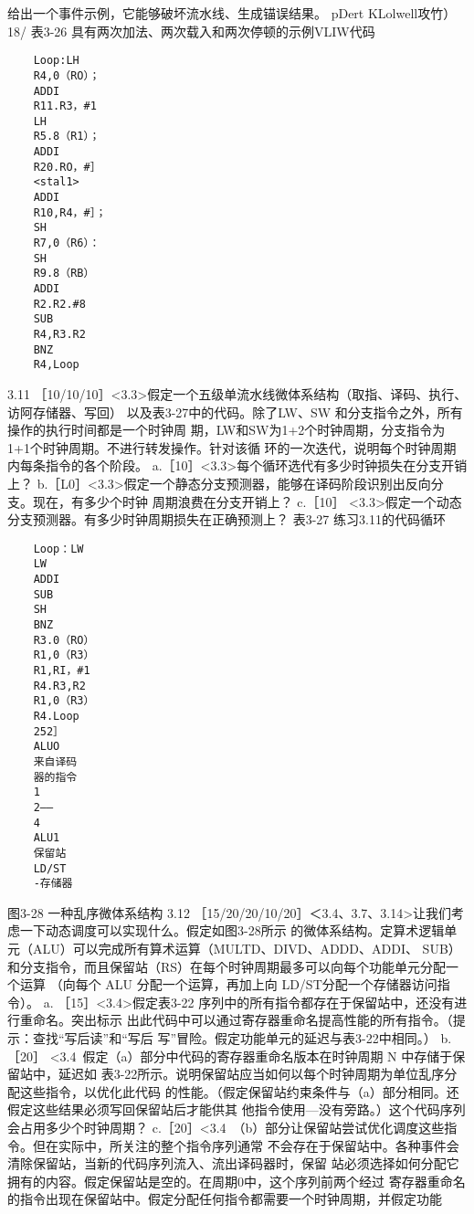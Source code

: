 给出一个事件示例，它能够破坏流水线、生成锚误结果。
pDert KLolwell攻竹）
18/
表3-26
具有两次加法、两次载入和两次停顿的示例VLIW代码
\begin{verbatim}
    Loop:LH
    R4,0（RO）；
    ADDI
    R11.R3，#1
    LH
    R5.8（R1）；
    ADDI
    R20.RO，#］
    <stal1>
    ADDI
    R10,R4，#］；
    SH
    R7,0（R6）：
    SH
    R9.8（RB）
    ADDI
    R2.R2.#8
    SUB
    R4,R3.R2
    BNZ
    R4,Loop
\end{verbatim}
3.11 ［10/10/10］<3.3>假定一个五级单流水线微体系结构（取指、译码、执行、访阿存储器、写回）
以及表3-27中的代码。除了LW、SW 和分支指令之外，所有操作的执行时间都是一个时钟周
期，LW和SW为1+2个时钟周期，分支指令为1+1个时钟周期。不进行转发操作。针对该循
环的一次迭代，说明每个时钟周期内每条指令的各个阶段。
a.［10］<3.3>每个循环选代有多少时钟损失在分支开销上？
b.［L0］<3.3>假定一个静态分支预测器，能够在译码阶段识别出反向分支。现在，有多少个时钟
周期浪费在分支开销上？
c.［10］ <3.3>假定一个动态分支预测器。有多少时钟周期损失在正确预测上？
表3-27 练习3.11的代码循环
\begin{verbatim}
    Loop：LW
    LW
    ADDI
    SUB
    SH
    BNZ
    R3.0（RO）
    R1,0（R3）
    R1,RI，#1
    R4.R3,R2
    R1,0（R3）
    R4.Loop
    252］
    ALUO
    来自译码
    器的指令
    1
    2——
    4
    ALU1
    保留站
    LD/ST
    -存储器
\end{verbatim}
图3-28 一种乱序微体系结构
3.12 ［15/20/20/10/20］＜3.4、3.7、3.14>让我们考虑一下动态调度可以实现什么。假定如图3-28所示
的微体系结构。定算术逻辑单元（ALU）可以完成所有算术运算（MULTD、DIVD、ADDD、ADDI、
SUB）和分支指令，而且保留站（RS）在每个时钟周期最多可以向每个功能单元分配一个运算
（向每个 ALU 分配一个运算，再加上向 LD/ST分配一个存储器访问指令）。
a. ［15］<3.4>假定表3-22 序列中的所有指令都存在于保留站中，还没有进行重命名。突出标示
出此代码中可以通过寄存器重命名提高性能的所有指令。（提示：查找“写后读”和“写后
写”冒险。假定功能单元的延迟与表3-22中相同。）
b.［20］ <3.4~假定（a）部分中代码的寄存器重命名版本在时钟周期 N 中存储于保留站中，延迟如
表3-22所示。说明保留站应当如何以每个时钟周期为单位乱序分配这些指令，以优化此代码
的性能。（假定保留站约束条件与（a）部分相同。还假定这些结果必须写回保留站后才能供其
他指令使用—没有旁路。）这个代码序列会占用多少个时钟周期？
c.［20］<3.4~（b）部分让保留站尝试优化调度这些指令。但在实际中，所关注的整个指令序列通常
不会存在于保留站中。各种事件会清除保留站，当新的代码序列流入、流出译码器时，保留
站必须选择如何分配它拥有的内容。假定保留站是空的。在周期0中，这个序列前两个经过
寄存器重命名的指令出现在保留站中。假定分配任何指令都需要一个时钟周期，并假定功能
